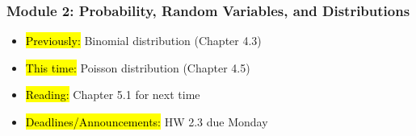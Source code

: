 
\begin{frame}
    \frametitle{Module 2: Probability, Random Variables, and Distributions}
    \begin{itemize}
        \item \hl{Previously: } Binomial distribution (Chapter 4.3)
        \item \hl{This time: } Poisson distribution (Chapter 4.5)
        \item \hl{Reading: } Chapter 5.1 for next time
        \item \hl{Deadlines/Announcements: } HW 2.3 due Monday
    \end{itemize}
    
\end{frame}
    